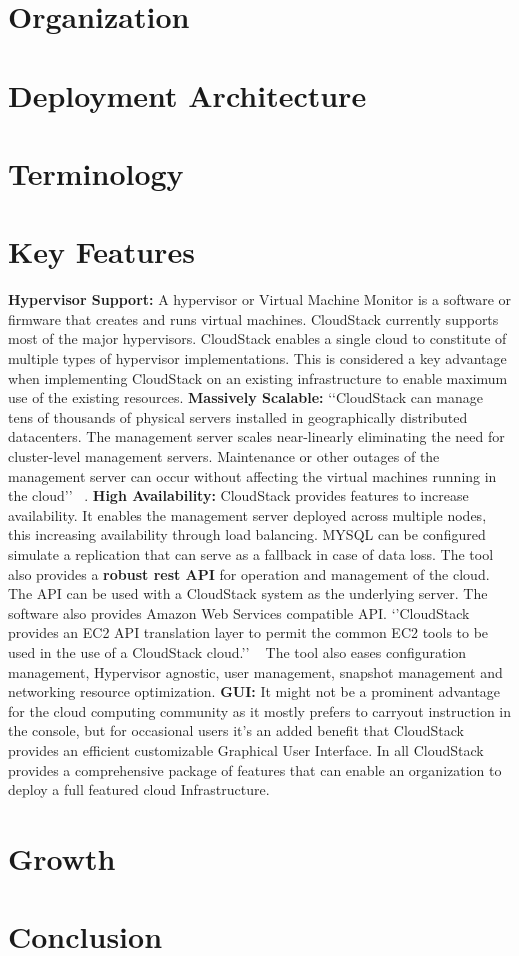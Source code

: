 \section{Organization}

\section{Deployment Architecture}

\section{Terminology}

\section{Key Features}
{\bf Hypervisor Support: } A hypervisor or Virtual Machine Monitor is a software or firmware that creates 
and runs virtual machines. CloudStack currently supports most of the major hypervisors.  CloudStack enables 
a single cloud to constitute of multiple types of hypervisor implementations. This is considered a key 
advantage when implementing CloudStack on an existing infrastructure to enable maximum use of the existing 
resources. {\bf Massively Scalable:} ‘‘CloudStack can manage tens of thousands of physical servers installed
in geographically distributed datacenters. The management server scales near-linearly eliminating the need for
cluster-level management servers. Maintenance or other outages of the management server can occur without
affecting the virtual machines running in the cloud’’ ~\cite{hid-sp18-417-www-cloudstack-scalability}. 
{\bf High Availability:} CloudStack provides features to increase availability. It enables the management server 
deployed across multiple nodes, this increasing availability through load balancing. MYSQL can be configured
simulate a replication that can serve as a fallback in case of data loss. The tool also provides a {\bf robust rest API} 
for operation and management of the cloud. The API can be used with a CloudStack system as the underlying server. 
The software also provides Amazon Web Services compatible API. ‘’CloudStack provides an EC2 API translation layer
to permit the common EC2 tools to be used in the use of a CloudStack cloud.’’ ~\cite{hid-sp18-417-www-cloudstack-aws}
The tool also eases configuration management, Hypervisor agnostic, user management, snapshot management and 
networking resource optimization. 
{\bf GUI: } It might not be a prominent advantage for the cloud computing community as it mostly prefers to carryout 
instruction in the console, but for occasional users it’s an added benefit that CloudStack provides an efficient 
customizable Graphical User Interface. In all CloudStack provides a comprehensive package of features that can enable 
an organization to deploy a full featured cloud Infrastructure.


\section{Growth}

\section{Conclusion}


 
